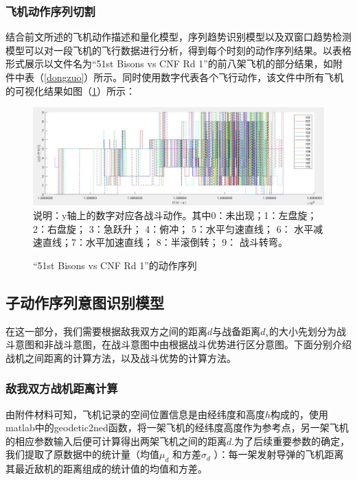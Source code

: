 \documentclass{my_paper}
\begin{document}
\subsubsection{飞机动作序列切割}

结合前文所述的飞机动作描述和量化模型，序列趋势识别模型以及双窗口趋势检测模型可以对一段飞机的飞行数据进行分析，得到每个时刻的动作序列结果。以表格形式展示以文件名为“51st Bisons vs CNF Rd 1”的前八架飞机的部分结果，如附件中表（\ref{dongzuo}）所示。同时使用数字代表各个飞行动作，该文件中所有飞机的可视化结果如图（\ref{dzx}）所示：

\begin {figure}[h]
\centering %
\includegraphics[width=\textwidth]{1zhuan.jpg}
说明：y轴上的数字对应各战斗动作。其中0：未出现；1：左盘旋；  2：右盘旋；  3：急跃升；  4：俯冲；  5：水平匀速直线； 6： 水平减速直线；7：水平加速直线；  8：半滚倒转； 9： 战斗转弯。
\caption{“51st Bisons vs CNF Rd 1”的动作序列} %
\label{dzx}
\end {figure}

\subsection{子动作序列意图识别模型}
在这一部分，我们需要根据敌我双方之间的距离$d$与战备距离$d_s$的大小先划分为战斗意图和非战斗意图，在战斗意图中由根据战斗优势进行区分意图。下面分别介绍战机之间距离的计算方法，以及战斗优势的计算方法。

\subsubsection{敌我双方战机距离计算}

由附件材料可知，飞机记录的空间位置信息是由经纬度和高度$h$构成的，使用matlab中的geodetic2ned函数，将一架飞机的经纬度高度作为参考点，另一架飞机的相应参数输入后便可计算得出两架飞机之间的距离$d$.为了后续重要参数的确定，我们提取了原数据中的统计量（均值$ \mu_{d} $ 和方差$ \sigma_{d} $ ）：每一架发射导弹的飞机距离其最近敌机的距离组成的统计值的均值和方差。

\end{document}
